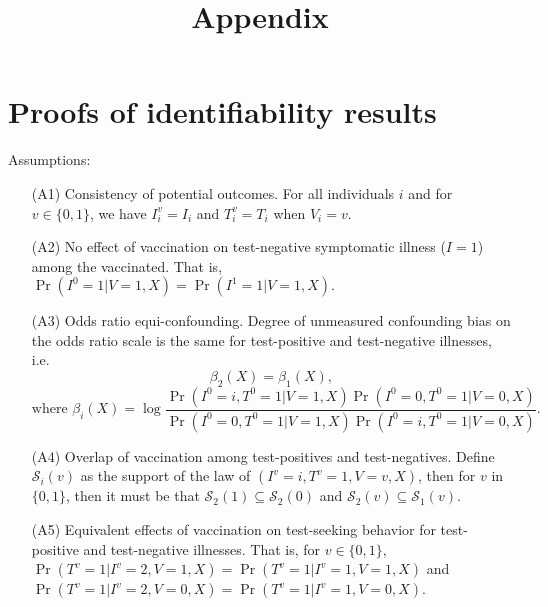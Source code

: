 \documentclass{article}
\title{Appendix}
\begin{document}
\maketitle
\section{Proofs of identifiability results}
\noindent Assumptions:
\begin{itemize}
    \item[(A1)] Consistency of potential outcomes. For all individuals $i$ and for $v \in \{0, 1\}$, we have $I_i^v = I_i$ and $T_i^v = T_i$ when $V_i = v$.
    \item[(A2)] No effect of vaccination on test-negative symptomatic illness ($I = 1$) among the vaccinated. That is, $\Pr(I^0 = 1 | V = 1, X) = \Pr(I^1 = 1 | V = 1, X).$
    \item[(A3)] Odds ratio equi-confounding. Degree of unmeasured confounding bias on the odds ratio scale is the same for test-positive and test-negative illnesses, i.e. 
    $$\beta_2(X) = \beta_1(X), $$
    $$ \text{where } \beta_i(X) = \log \frac{\Pr(I^0 = i, T^0 = 1 | V = 1, X)\Pr(I^0 = 0, T^0 = 1 | V = 0, X)}{\Pr(I^0 = 0, T^0 = 1 | V = 1, X)\Pr(I^0 = i, T^0 = 1| V = 0, X)}.$$
    \item[(A4)] Overlap of vaccination among test-positives and test-negatives. Define $\mathcal{S}_i(v)$ as the support of the law of $(I^v = i, T^v = 1, V = v, X)$, then for $v$ in $\{0,1\}$, then it must be that $\mathcal{S}_2(1) \subseteq \mathcal{S}_2(0)$ and $\mathcal{S}_2(v) \subseteq \mathcal{S}_1(v).$
    \item[(A5)] Equivalent effects of vaccination on test-seeking behavior for test-positive and test-negative illnesses. That is, for $v \in \{0, 1\}$, $\Pr(T^v = 1 | I^v = 2, V = 1, X) = \Pr(T^v = 1 | I^v = 1, V = 1, X)$ and $\Pr(T^v = 1 | I^v = 2, V = 0, X) = \Pr(T^v = 1 | I^v = 1, V = 0, X)$.
\end{itemize}
\end{document}

